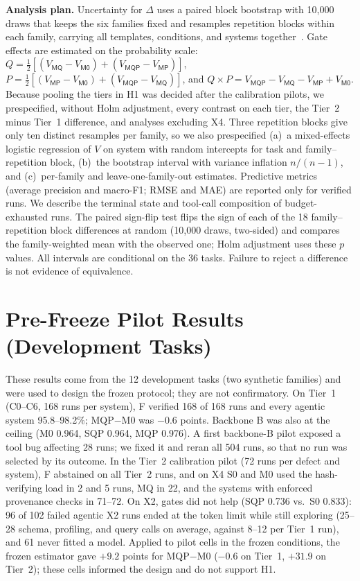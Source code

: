 \documentclass[conference]{IEEEtran}
\newcommand{\sys}[1]{\textsf{#1}}
\begin{document}
\textbf{Analysis plan.} Uncertainty for $\Delta$ uses a paired block bootstrap with 10,000 draws that keeps the six
families fixed and resamples repetition blocks within each family, carrying all templates, conditions, and systems
together~\cite{efron1979bootstrap,saravanan2020hierarchical}. Gate effects are estimated on the probability scale:
$Q=\tfrac12[(V_{\sys{MQ}}-V_{\sys{M0}})+(V_{\sys{MQP}}-V_{\sys{MP}})]$,
$P=\tfrac12[(V_{\sys{MP}}-V_{\sys{M0}})+(V_{\sys{MQP}}-V_{\sys{MQ}})]$, and
$Q\!\times\!P=V_{\sys{MQP}}-V_{\sys{MQ}}-V_{\sys{MP}}+V_{\sys{M0}}$. Because pooling the tiers in H1 was decided after
the calibration pilots, we prespecified, without Holm adjustment, every contrast on each tier, the Tier~2 minus
Tier~1 difference, and analyses excluding X4. Three repetition blocks give only ten distinct resamples per family,
so we also prespecified (a)~a mixed-effects logistic regression of $V$ on system with random intercepts for task
and family--repetition block, (b)~the bootstrap interval with variance inflation $n/(n-1)$, and (c)~per-family and
leave-one-family-out estimates. Predictive metrics (average precision and macro-F1; RMSE and MAE) are reported only
for verified runs. We describe the terminal state and tool-call composition of budget-exhausted runs. The paired sign-flip test
flips the sign of each of the 18 family--repetition block differences at random (10,000 draws, two-sided) and
compares the family-weighted mean with the observed one; Holm adjustment uses these $p$ values. All intervals are
conditional on the 36 tasks. Failure to reject a difference is not evidence of equivalence.

\section{Pre-Freeze Pilot Results (Development Tasks)}
\label{sec:pilot}
These results come from the 12 development tasks (two synthetic families) and were used to design the frozen
protocol; they are not confirmatory. On Tier~1 (C0--C6, 168 runs per system), \sys{F} verified 168 of 168 runs and
every agentic system 95.8--98.2\%; \sys{MQP}$-$\sys{M0} was $-0.6$ points. Backbone B was also at the ceiling (\sys{M0}
0.964, \sys{SQP} 0.964, \sys{MQP} 0.976). A first backbone-B pilot exposed a tool bug affecting 28 runs; we fixed it and
reran all 504 runs, so that no run was selected by its outcome. In the Tier~2 calibration pilot (72 runs per defect and
system), \sys{F} abstained on all Tier~2 runs, and on X4 \sys{S0} and \sys{M0} used the hash-verifying load in 2 and 5
runs, \sys{MQ} in 22, and the systems with enforced provenance checks in 71--72. On X2, gates did not help (\sys{SQP}
0.736 vs.\ \sys{S0} 0.833): 96 of 102 failed agentic X2 runs ended at the token limit while still exploring (25--28
schema, profiling, and query calls on average, against 8--12 per Tier~1 run), and 61 never fitted a model. Applied to
pilot cells in the frozen conditions, the frozen estimator gave $+9.2$ points for \sys{MQP}$-$\sys{M0} ($-0.6$ on
Tier~1, $+31.9$ on Tier~2); these cells informed the design and do not support H1.
\end{document}
